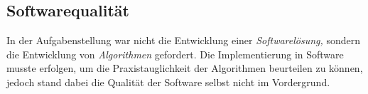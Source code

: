 \documentclass[../main/thesis.tex]{subfiles}
\begin{document}



\subsection{Softwarequalität}

In der Aufgabenstellung war nicht die Entwicklung einer \emph{Softwarelösung,} sondern die Entwicklung von \emph{Algorithmen} gefordert.
Die Implementierung in Software musste erfolgen, um die Praxistauglichkeit der Algorithmen beurteilen zu können, jedoch stand dabei die Qualität der Software selbst nicht im Vordergrund.
\end{document}
